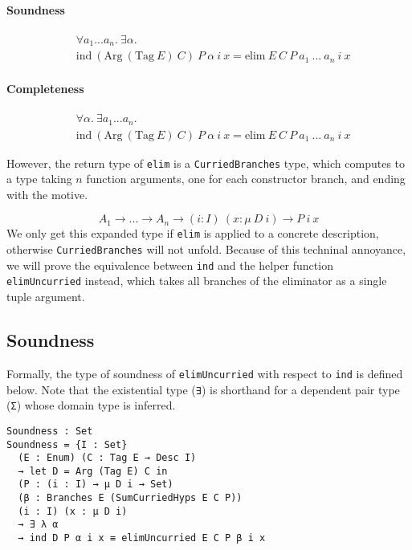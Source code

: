 \documentclass[nonatbib]{sigplanconf}
\begin{document}
\paragraph{Soundness}

\begin{align*}
&\forall a_1 ... a_n. ~ \exists \alpha. \\
&\textrm{ind} ~ (\textrm{Arg} ~ (\textrm{Tag} ~ E) ~ C) ~ P ~ \alpha ~ i ~ x =
\textrm{elim} ~ E ~ C ~ P ~ a_1 ~ ... ~ a_n ~ i ~ x
\end{align*}

\paragraph{Completeness}

\begin{align*}
&\forall \alpha. ~ \exists a_1 ... a_n. \\
&\textrm{ind} ~ (\textrm{Arg} ~ (\textrm{Tag} ~ E) ~ C) ~ P ~ \alpha ~ i ~ x =
\textrm{elim} ~ E ~ C ~ P ~ a_1 ~ ... ~ a_n ~ i ~ x
\end{align*}

However, the return type of {\tt elim} is a {\tt CurriedBranches} type,
which computes to a type taking $n$ function arguments, 
one for each constructor branch,
and ending with the motive.

\[
A_1 → ... → A_n → (i : I) ~ (x : \mu ~ D ~ i) → P ~ i ~ x
\]
\linebreak
We only get this expanded type if {\tt elim} is applied to a concrete
description, otherwise {\tt CurriedBranches} will not unfold. Because
of this techninal annoyance, we will prove the equivalence between
{\tt ind} and the helper function {\tt elimUncurried} instead, which
takes all branches of the eliminator as a single tuple argument.

\subsection{Soundness}

Formally, the type of soundness of {\tt elimUncurried} with respect to
{\tt ind} is defined below.
Note that the existential type ({\tt ∃}) is
shorthand for a dependent pair type ({\tt Σ}) whose domain type is
inferred.

\begin{verbatim}
Soundness : Set
Soundness = {I : Set}
  (E : Enum) (C : Tag E → Desc I)
  → let D = Arg (Tag E) C in
  (P : (i : I) → μ D i → Set)
  (β : Branches E (SumCurriedHyps E C P))
  (i : I) (x : μ D i)
  → ∃ λ α
  → ind D P α i x ≡ elimUncurried E C P β i x
\end{verbatim}
\end{document}
